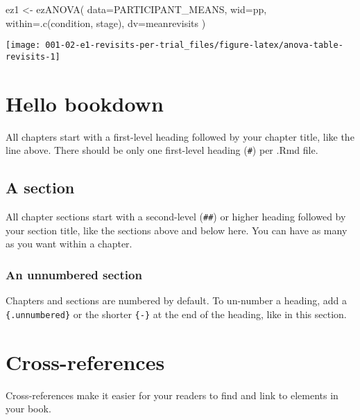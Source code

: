 \documentclass[
]{book}
\newenvironment{Shaded}{\begin{snugshade}}{\end{snugshade}}
\newcommand{\AttributeTok}[1]{\textcolor[rgb]{0.77,0.63,0.00}{#1}}
\newcommand{\FunctionTok}[1]{\textcolor[rgb]{0.00,0.00,0.00}{#1}}
\newcommand{\NormalTok}[1]{#1}
\newcommand{\OtherTok}[1]{\textcolor[rgb]{0.56,0.35,0.01}{#1}}
\theoremstyle{definition}
\theoremstyle{definition}
\theoremstyle{definition}
\theoremstyle{definition}
\theoremstyle{remark}
\begin{document}
\begin{Shaded}
\begin{Highlighting}[]
\NormalTok{ez1 }\OtherTok{\textless{}{-}} \FunctionTok{ezANOVA}\NormalTok{(}
  \AttributeTok{data=}\NormalTok{PARTICIPANT\_MEANS,}
  \AttributeTok{wid=}\NormalTok{pp,}
  \AttributeTok{within=}\FunctionTok{.c}\NormalTok{(condition, stage),}
  \AttributeTok{dv=}\NormalTok{meanrevisits}
\NormalTok{)}
\end{Highlighting}
\end{Shaded}

\texttt{[image: 001-02-e1-revisits-per-trial\_files/figure-latex/anova-table-revisits-1]}

\hypertarget{hello-bookdown}{%
\chapter{Hello bookdown}\label{hello-bookdown}}

All chapters start with a first-level heading followed by your chapter title, like the line above. There should be only one first-level heading (\texttt{\#}) per .Rmd file.

\hypertarget{a-section}{%
\section{A section}\label{a-section}}

All chapter sections start with a second-level (\texttt{\#\#}) or higher heading followed by your section title, like the sections above and below here. You can have as many as you want within a chapter.

\hypertarget{an-unnumbered-section}{%
\subsection*{An unnumbered section}\label{an-unnumbered-section}}

Chapters and sections are numbered by default. To un-number a heading, add a \texttt{\{.unnumbered\}} or the shorter \texttt{\{-\}} at the end of the heading, like in this section.

\hypertarget{cross}{%
\chapter{Cross-references}\label{cross}}

Cross-references make it easier for your readers to find and link to elements in your book.
\end{document}

